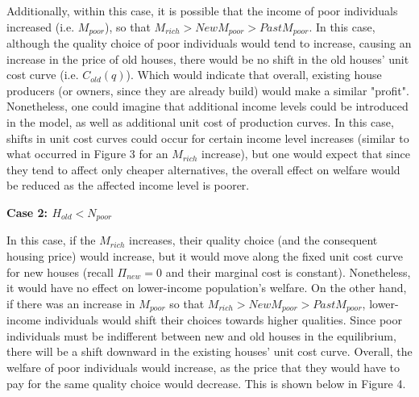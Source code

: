 \documentclass[12pt]{paper}
\begin{document}
Additionally, within this case, it is possible that the income of poor
individuals increased (i.e. $M_{poor}$), so that
$M_{rich}>New M_{poor}>Past M_{poor}$. In this case, although the
quality choice of poor individuals would tend to increase, causing an
increase in the price of old houses, there would be no shift in the
old houses' unit cost curve (i.e. $C_{old} (q)$). Which would indicate
that overall, existing house producers (or owners, since they are
already build) would make a similar "profit". Nonetheless, one could
imagine that additional income levels could be introduced in the
model, as well as additional unit cost of production curves. In this
case, shifts in unit cost curves could occur for certain income level
increases (similar to what occurred in Figure 3 for an $M_{rich}$
increase), but one would expect that since they tend to affect only
cheaper alternatives, the overall effect on welfare would be reduced
as the affected income level is poorer.
\newpage

\textbf{Case 2: $H_{old} < N_{poor}$}

In this case, if the $M_{rich}$ increases, their quality choice (and
the consequent housing price) would increase, but it would move along
the fixed unit cost curve for new houses (recall $\Pi_{new}=0$ and their
marginal cost is constant). Nonetheless, it would have no effect on
lower-income population's welfare.  On the other hand, if there was an
increase in $M_{poor}$ so that $M_{rich}>New M_{poor}>Past M_{poor}$,
lower-income individuals would shift their choices towards higher
qualities. Since poor individuals must be indifferent between new and
old houses in the equilibrium, there will be a shift downward in the
existing houses' unit cost curve. Overall, the welfare of poor
individuals would increase, as the price that they would have to pay
for the same quality choice would decrease. This is shown below in
Figure 4.
\\
\end{document}
